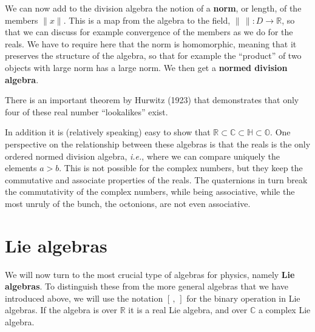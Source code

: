 \documentclass[notes.tex]{subfiles}
\begin{document}
We can now add to the division algebra the notion of a {\bf norm}, or length, of the members $\|x\|$. This is a map from the algebra to the field, $\|\,\|:D\to\mathbb{R}$, so that we can discuss for example convergence of the members as we do for the reals. We have to require here that the norm is homomorphic, meaning that it preserves the structure of the algebra, so that for example the ``product''  of two objects with large norm has a large norm. We then get a {\bf normed division algebra}. 

There is an important theorem by Hurwitz (1923) that demonstrates that only four of these real number ``lookalikes'' exist.

In addition it is (relatively speaking) easy to show that $\mathbb{R} \subset\mathbb{C}\subset\mathbb{H}\subset\mathbb{O}$. One perspective on the relationship between these algebras is that the reals is the only ordered normed division algebra, {\it i.e.}, where we can compare uniquely the elements $a>b$. This is not possible for the complex numbers, but they keep the commutative and associate properties of the reals. The quaternions in turn break the commutativity of the complex numbers, while being associative, while the most unruly of the bunch, the octonions, are not even associative.


\section{Lie algebras}
\label{sec:lie_algebras}
We will now turn to the most crucial type of algebras for physics, namely {\bf Lie algebras}. To distinguish these from the more general algebras that we have introduced above, we will use the notation $[\,,\,]$ for the binary operation in Lie algebras. 
If the algebra is over $\mathbb R$ it is a real Lie algebra, and over $\mathbb C$ a complex Lie algebra.
\end{document}
